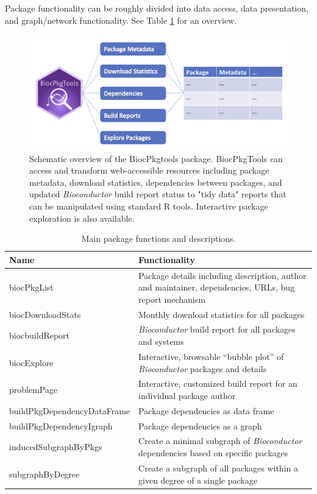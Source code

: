 \documentclass[9pt,a4paper]{extarticle}\usepackage[]{graphicx}\usepackage[]{color}
\begin{document}
Package functionality can be roughly divided into data access, data
presentation, and graph/network functionality. See Table
\ref{tab:functions} for an overview.

\begin{figure}
  \caption{Schematic overview of the BiocPkgtools package. BiocPkgTools can access and transform web-accessible resources including package metadata, download statistics, dependencies between packages, and updated \emph{Bioconductor} build report status to "tidy data" reports that can be manipulated using standard R tools. Interactive package exploration is also available.}
  \label{fig:overview}
  \includegraphics[width=1.0\textwidth]{BiocPkgToolsFig1mock.png}
\end{figure}


\begin{table}[h]
  \caption{Main package functions and descriptions.}
  \label{tab:functions}
  \begin{tabularx}{\linewidth}{ l X }
    \hline 
    Name & Functionality \\
    \hline 
    biocPkgList & Package details including description, author and maintainer, dependencies, URLs, bug report mechanism \\
    biocDownloadStats & Monthly download statistics for all packages \\
    biocbuildReport & \emph{Bioconductor} build report for all packages and systems \\
    biocExplore & Interactive, browsable ``bubble plot'' of \emph{Bioconductor} packages and details \\
    problemPage & Interactive, customized build report for an individual package author \\
    buildPkgDependencyDataFrame & Package dependencies as data frame \\
    buildPkgDependencyIgraph & Package dependencies as a graph \citep{igraph} \\
    inducedSubgraphByPkgs & Create a minimal subgraph of \emph{Bioconductor} dependencies based on specific packages \\
    subgraphByDegree & Create a subgraph of all packages within a given degree of a single package \\
    \hline
  \end{tabularx} 
\end{table}
\end{document}
